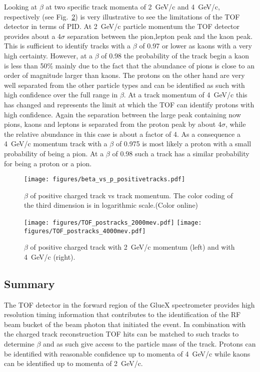 Looking at $\beta$ at two specific track momenta of 2~GeV/c and 4~GeV/c, respectively (see Fig.~\ref{fig:betaproj}) is very illustrative to see the limitations
of the TOF detector in terms of PID. At 2~GeV/c particle momentum the TOF detector provides about a 4$\sigma$ separation between
the pion,lepton peak and the kaon peak. This is sufficient to identify tracks with a $\beta$ of 0.97 or lower as kaons with a very
high certainty. However, at a $\beta$ of 0.98 the probability of the track begin a kaon is less than 50\% mainly due to the fact
that the abundance of pions is close to an order of magnitude larger than kaons. The protons on the other hand are very well
separated from the other particle types and can be identified as such with high confidence over the full range in $\beta$.
At a track momentum of 4~GeV/c this has changed and represents the limit at which the TOF can identify protons with high confidence. Again the separation between the large peak containing now pions, kaons and leptons is separated from the proton
peak by about 4$\sigma$, while the relative abundance in this case is about a factor of 4. As a consequence a 4~GeV/c momentum
track with a $\beta$ of 0.975 is most likely a proton with a small probability of being a pion. At a $\beta$ of 0.98 such
a track has a similar probability for being a proton or a pion.
\begin{figure}[tbp]
\begin{center}
\texttt{[image: figures/beta\_vs\_p\_positivetracks.pdf]}
\caption{\label{fig:betavsp}$\beta$ of positive charged track vs track momentum. The color coding of the third dimension
is in logarithmic scale.(Color online)}
\end{center}
\end{figure}

\begin{figure}[tbp]
\begin{center}
\texttt{[image: figures/TOF\_postracks\_2000mev.pdf]}
\texttt{[image: figures/TOF\_postracks\_4000mev.pdf]}
\caption{\label{fig:betaproj}$\beta$ of positive charged track with 2~GeV/c momentum (left) and with 4~GeV/c (right).}
\end{center}
\end{figure}

\subsection{Summary \label{sec:scsummary}}
The TOF detector in the forward region of the GlueX spectrometer provides high resolution timing information that contributes
to the identification of the RF beam bucket of the beam photon that initiated the event. In combination with the charged
track reconstruction TOF hits can be matched to such tracks to determine $\beta$ and as such give access to the particle
mass of the track. Protons can be identified with reasonable confidence up to momenta of 4~GeV/c while kaons can be
identified up to momenta of 2~GeV/c.
